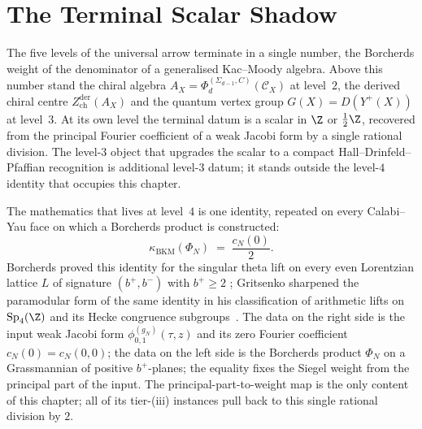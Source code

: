 \chapter{The Terminal Scalar Shadow}
\label{ch:borcherds-terminus}

The five levels of the universal arrow terminate in a single number,
the Borcherds weight of the denominator of a generalised Kac--Moody
algebra.  Above this number stand the chiral algebra
$A_X = \Phi^{(\Sigma_{d-1}, C)}_d(\mathcal C_X)$ at level~$2$, the
derived chiral centre $Z^{\mathrm{der}}_{\mathrm{ch}}(A_X)$ and the
quantum vertex group $G(X) = D(Y^+(X))$ at level~$3$.  At its own
level the terminal datum is a scalar in $\Z$ or $\tfrac12\Z$,
recovered from the principal Fourier coefficient of a weak Jacobi
form by a single rational division.  The level-$3$ object that
upgrades the scalar to a compact Hall--Drinfeld--Pfaffian recognition
is additional level-$3$ datum; it stands outside the level-$4$
identity that occupies this chapter.

The mathematics that lives at level~$4$ is one identity, repeated
on every Calabi--Yau face on which a Borcherds product is
constructed:
\[
 \kappa_{\mathrm{BKM}}(\Phi_N) \;=\; \frac{c_N(0)}{2}.
\]
Borcherds proved this identity for the singular theta lift on every
even Lorentzian lattice $L$ of signature $(b^+, b^-)$ with $b^+ \ge 2$
\cite[Theorem~13.3]{Borcherds1998}; Gritsenko sharpened the
paramodular form of the same identity in his classification of
arithmetic lifts on $\mathrm{Sp}_4(\Z)$ and its Hecke congruence
subgroups~\cite{Gritsenko1999}.  The data on the right side is the
input weak Jacobi form $\phi_{0, 1}^{(g_N)}(\tau, z)$ and its zero
Fourier coefficient $c_N(0) = c_N(0, 0)$; the data on the left side
is the Borcherds product $\Phi_N$ on a Grassmannian of positive
$b^+$-planes; the equality fixes the Siegel weight from the principal
part of the input.  The principal-part-to-weight map is the only
content of this chapter; all of its tier-(iii) instances pull back to
this single rational division by $2$.


